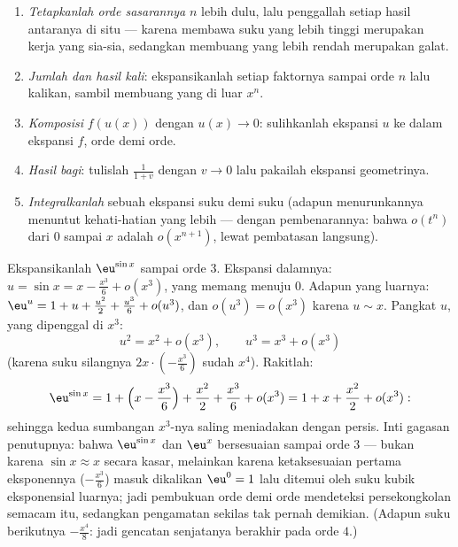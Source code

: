 \begin{method}\label{met:b1:taylor:compute}
\begin{enumerate}
  \item \emph{Tetapkanlah orde sasarannya} $n$ lebih dulu, lalu penggallah setiap
        hasil antaranya di situ --- karena membawa suku yang lebih tinggi merupakan
        kerja yang sia-sia, sedangkan membuang yang lebih rendah merupakan galat.
  \item \emph{Jumlah dan hasil kali}: ekspansikanlah setiap faktornya sampai orde $n$ lalu
        kalikan, sambil membuang yang di luar $x^n$.
  \item \emph{Komposisi} $f(u(x))$ dengan $u(x) \to 0$: sulihkanlah
        ekspansi $u$ ke dalam ekspansi $f$, orde demi orde.
  \item \emph{Hasil bagi}: tulislah $\frac{1}{1 + v}$ dengan $v \to 0$ lalu
        pakailah ekspansi geometrinya.
  \item \emph{Integralkanlah} sebuah ekspansi suku demi suku (adapun menurunkannya
        menuntut kehati-hatian yang lebih --- dengan pembenarannya: bahwa  $o(t^n)$
        dari $0$ sampai $x$ adalah $o(x^{n+1})$, lewat pembatasan langsung).
\end{enumerate}
\end{method}

\begin{example}\label{ex:b1:taylor:esin}
Ekspansikanlah $\eu^{\sin x}$ sampai orde $3$. Ekspansi dalamnya: $u = \sin x
= x - \frac{x^3}{6} + o(x^3)$, yang memang menuju $0$. Adapun yang luarnya:
$\eu^u = 1 + u + \frac{u^2}{2} + \frac{u^3}{6} + o(u^3)$, dan
$o(u^3) = o(x^3)$ karena $u \sim x$. Pangkat $u$, yang dipenggal di
$x^3$:
\[
u^2 = x^2 + o(x^3), \qquad u^3 = x^3 + o(x^3)
\]
(karena suku silangnya $2x\cdot(-\frac{x^3}{6})$ sudah $x^4$).
Rakitlah:
\[
\eu^{\sin x} = 1 + \Bigl(x - \frac{x^3}{6}\Bigr) + \frac{x^2}{2}
+ \frac{x^3}{6} + o(x^3)
= 1 + x + \frac{x^2}{2} + o(x^3) :
\]
sehingga kedua sumbangan $x^3$-nya saling meniadakan dengan persis. Inti gagasan penutupnya:
bahwa $\eu^{\sin x}$ dan $\eu^x$ bersesuaian sampai orde $3$ --- bukan
karena $\sin x \approx x$ secara kasar, melainkan karena ketaksesuaian
pertama eksponennya ($-\frac{x^3}{6}$) masuk
dikalikan $\eu^0 = 1$ lalu ditemui oleh suku kubik
eksponensial luarnya; jadi pembukuan orde demi orde mendeteksi persekongkolan
semacam itu, sedangkan pengamatan sekilas tak pernah demikian. (Adapun suku berikutnya
$-\frac{x^4}{8}$: jadi gencatan senjatanya berakhir pada orde $4$.)
\end{example}

